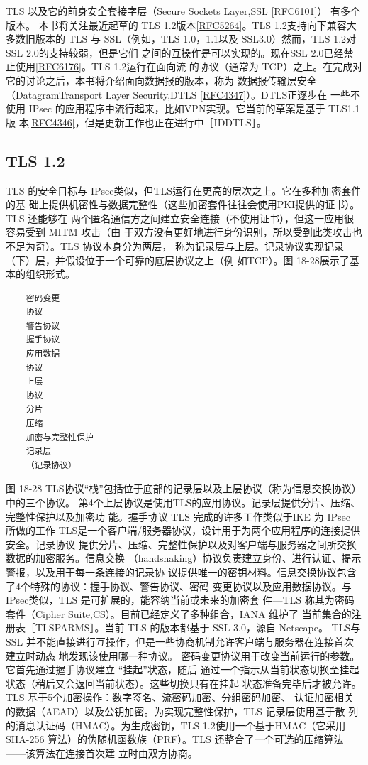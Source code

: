 TLS 以及它的前身安全套接字层（Secure Sockets Layer,SSL \href{https://www.rfc-editor.org/rfc/rfc6101}{[RFC6101]}） 有多个版本。
本书将关注最近起草的 TLS 1.2版本\href{https://www.rfc-editor.org/rfc/rfc5264}{[RFC5264]}。TLS 1.2支持向下兼容大多数旧版本的 TLS
与 SSL（例如，TLS 1.0，1.1以及 SSL3.0）然而，TLS 1.2对SSL 2.0的支持较弱，但是它们
之间的互操作是可以实现的。现在SSL 2.0已经禁止使用\href{https://www.rfc-editor.org/rfc/rfc6176}{[RFC6176]}。TLS 1.2运行在面向流
的协议（通常为 TCP）之上。在完成对它的讨论之后，本书将介绍面向数据报的版本，称为
数据报传输层安全（DatagramTransport Layer Security,DTLS \href{https://www.rfc-editor.org/rfc/rfc4347}{[RFC4347]}）。DTLS正逐步在
一些不使用 IPsec 的应用程序中流行起来，比如VPN实现。它当前的草案是基于 TLS1.1版
本\href{https://www.rfc-editor.org/rfc/rfc4346}{[RFC4346]}，但是更新工作也正在进行中［IDDTLS］。

\subsection{TLS 1.2}
TLS 的安全目标与 IPsec类似，但TLS运行在更高的层次之上。它在多种加密套件的基
础上提供机密性与数据完整性（这些加密套件往往会使用PKI提供的证书）。TLS 还能够在
两个匿名通信方之间建立安全连接（不使用证书），但这一应用很容易受到 MITM 攻击（由
于双方没有更好地进行身份识别，所以受到此类攻击也不足为奇）。TLS 协议本身分为两层，
称为记录层与上层。记录协议实现记录（下）层，并假设位于一个可靠的底层协议之上（例
如TCP）。图 18-28展示了基本的组织形式。
\begin{verbatim}
    密码变更
    协议
    警告协议
    握手协议
    应用数据
    协议
    上层
    协议
    分片
    压缩
    加密与完整性保护
    记录层
    （记录协议）
\end{verbatim}
图 18-28
TLS协议“栈”包括位于底部的记录层以及上层协议（称为信息交换协议）中的三个协议。
第4个上层协议是使用TLS的应用协议。记录层提供分片、压缩、完整性保护以及加密功
能。握手协议 TLS 完成的许多工作类似于IKE 为 IPsec 所做的工作
TLS是一个客户端/服务器协议，设计用于为两个应用程序的连接提供安全。记录协议
提供分片、压缩、完整性保护以及对客户端与服务器之间所交换数据的加密服务。信息交换
（handshaking）协议负责建立身份、进行认证、提示警报，以及用于每一条连接的记录协
议提供唯一的密钥材料。信息交换协议包含了4个特殊的协议：握手协议、警告协议、密码
变更协议以及应用数据协议。与IPsec类似，TLS 是可扩展的，能容纳当前或未来的加密套
件—TLS 称其为密码套件（Cipher Suite,CS）。目前已经定义了多种组合，IANA 维护了
当前集合的注册表［TLSPARMS］。当前 TLS 的版本都基于 SSL 3.0，源自 Netscape。 TLS与
SSL 并不能直接进行互操作，但是一些协商机制允许客户端与服务器在连接首次建立时动态
地发现该使用哪一种协议。
密码变更协议用于改变当前运行的参数。它首先通过握手协议建立 “挂起”状态，随后
通过一个指示从当前状态切换至挂起状态（稍后又会返回当前状态）。这些切换只有在挂起
状态准备完毕后才被允许。TLS 基于5个加密操作：数字签名、流密码加密、分组密码加密、
认证加密相关的数据（AEAD）以及公钥加密。为实现完整性保护，TLS 记录层使用基于散
列的消息认证码（HMAC）。为生成密钥，TLS 1.2使用一个基于HMAC（它采用SHA-256
算法）的伪随机函数族（PRF）。TLS 还整合了一个可选的压缩算法——该算法在连接首次建
立时由双方协商。

